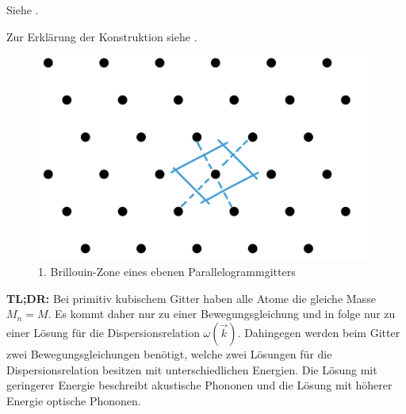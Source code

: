 \label{q:47}

Siehe .

\label{q:48}

Zur Erklärung der Konstruktion siehe .
\begin{figure}[H]
    \centering
    \begin{samepage}
        \includegraphics[width=0.4\linewidth]{resources/16-03-2012/BZ1.png}
        \caption[BZ1 Parallelogrammgitter]{1. Brillouin-Zone eines ebenen Parallelogrammgitters}
        \label{fig:BZ1_Parallelogrammgitter}
    \end{samepage}
\end{figure}

\label{q:49}

\textbf{TL;DR:} Bei primitiv kubischem Gitter haben alle Atome die gleiche Masse $M_n = M$.
Es kommt daher nur zu einer Bewegungsgleichung und in folge nur zu einer Lösung für die Dispersionsrelation $\omega(\vec{k})$.
Dahingegen werden beim  Gitter zwei Bewegungsgleichungen benötigt, welche zwei Lösungen für die Dispersionsrelation besitzen mit unterschiedlichen Energien.
Die Lösung mit geringerer Energie beschreibt akustische Phononen und die Lösung mit höherer Energie optische Phononen.

